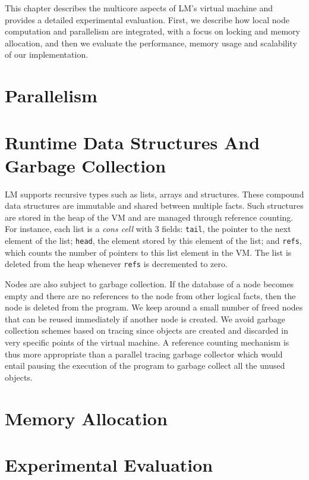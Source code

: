 This chapter describes the multicore aspects of LM's virtual machine and
provides a detailed experimental evaluation. First, we describe how local node
computation and parallelism are integrated, with a focus on locking and memory
allocation, and then we evaluate the performance, memory usage and scalability
of our implementation.

\section{Parallelism}\label{sec:implementation:parallelism}



\section{Runtime Data Structures And Garbage Collection}

LM supports recursive types such as lists, arrays and structures. These compound
data structures are immutable and shared between multiple facts. Such structures
are stored in the heap of the VM and are managed through reference counting. For
instance, each list is a \emph{cons cell} with 3 fields: \texttt{tail}, the
pointer to the next element of the list; \texttt{head}, the element stored by
this element of the list; and \texttt{refs}, which counts the number of pointers
to this list element in the VM. The list is deleted from the heap whenever
\texttt{refs} is decremented to zero.

Nodes are also subject to garbage collection. If the database of a node becomes
empty and there are no references to the node from other logical facts, then the
node is deleted from the program. We keep around a small number of freed nodes
that can be reused immediately if another node is created. We avoid garbage
collection schemes based on tracing since objects are created and discarded in
very specific points of the virtual machine. A reference counting mechanism is
thus more appropriate than a parallel tracing garbage collector which would
entail pausing the execution of the program to garbage collect all the unused
objects.

\section{Memory Allocation}\label{section:implementation:allocation}


\section{Experimental Evaluation}


